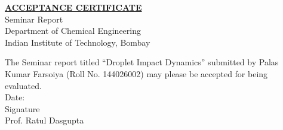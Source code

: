 \begin{center}
\underline{\textbf{\large ACCEPTANCE CERTIFICATE}} \\[1cm]
Seminar Report \\[0.2cm]
Department of Chemical Engineering \\
Indian Institute of Technology, Bombay \\[7.5mm]
\end{center}
The Seminar report titled  ``Droplet Impact Dynamics'' submitted by Palas Kumar Farsoiya (Roll No. 144026002) may please be accepted for being evaluated.\\[1cm]
Date:\\[1cm]
Signature\\
Prof. Ratul Dasgupta\\[2cm]
